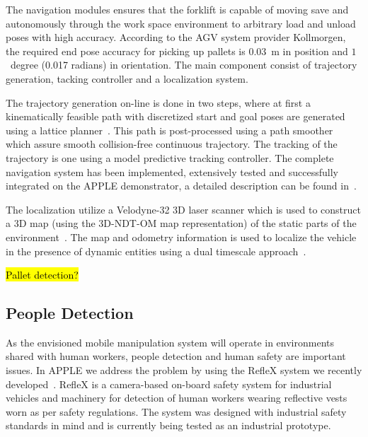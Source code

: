 The navigation modules ensures that the forklift is capable of moving save and autonomously through the work space environment to arbitrary load and unload poses with high accuracy. According to the AGV system provider Kollmorgen, the required end pose accuracy
for picking up pallets is $0.03$~m in position and $1$~degree (0.017 radians) in
orientation. The main component consist of trajectory generation, tacking controller and a localization system. 
 
The trajectory generation on-line is done in two steps, where at first a kinematically feasible path with discretized start and goal poses are generated using a lattice planner~\cite{Ciri14}. This path is post-processed using a path smoother~\cite{Andr15} which assure smooth collision-free continuous trajectory. The tracking of the trajectory is one using a model predictive tracking controller. The complete navigation system has been implemented, extensively tested and successfully
integrated on the APPLE demonstrator, a detailed description can be found in~\cite{Andr15}.

The localization utilize a Velodyne-32 3D laser scanner which is used to construct a 3D map (using the 3D-NDT-OM map representation) of the static parts of the environment~\cite{Stoy13}. The map and odometry information is used to localize the vehicle in the presence of dynamic entities using a dual timescale approach~\cite{Vale14}. 



\hl{Pallet detection?}

%
\subsection{People Detection}
\label{subsec:people_det}
%
As the envisioned mobile manipulation system will operate in environments shared with human workers,
people detection and human safety are important issues. In APPLE we address the problem by using the
RefleX system we recently developed~\cite{Mosb14}. RefleX is a camera-based on-board safety system
for industrial vehicles and machinery for detection of human workers wearing reflective vests worn
as per safety regulations. The system was designed with industrial safety standards in mind and is
currently being tested as an industrial prototype.
%
